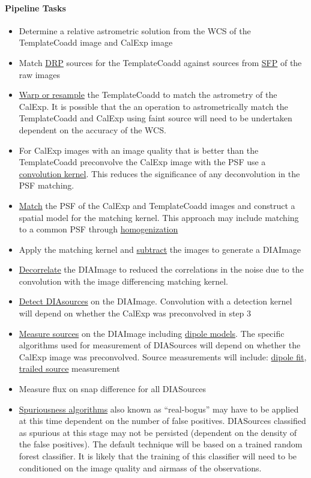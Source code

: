 \paragraph{Pipeline Tasks}
\begin{itemize}
\item Determine a relative astrometric solution from the WCS of the TemplateCoadd image and CalExp image
\item Match \hyperref[sec:apSourcemeasurement]{DRP} sources for the TemplateCoadd against sources from \hyperref[sec:apSingleFrameProcessing]{SFP} of the raw images 
\item \hyperref[sec:acWarping]{Warp or resample} the TemplateCoadd to match the astrometry of the CalExp. It is possible that the an operation to astrometrically match the TemplateCoadd and CalExp using faint source will need to be undertaken dependent on the accuracy of the WCS.
\item For CalExp images with an image quality that is better than the TemplateCoadd preconvolve the CalExp image with the PSF use a  \hyperref[sec:spKernels]{convolution kernel}. This reduces the significance of any deconvolution in the PSF matching.
\item \hyperref[sec:acDiffImDecorrelation]{Match} the PSF of the CalExp and TemplateCoadd images and construct a spatial model for the matching kernel. This approach may include matching to a common PSF through \hyperref[sec:acPSFHomogenization]{homogenization} 
\item Apply the matching kernel and \hyperref[sec:acImageSubtraction]{subtract} the images to generate a DIAImage
\item \hyperref[sec:acDiffImDecorrelation]{Decorrelate} the DIAImage to reduced the correlations in the noise due to the convolution with the image differencing matching kernel. 
\item \hyperref[sec:acSourceDetection]{Detect DIAsources} on the DIAImage. Convolution with a detection kernel will depend on whether the CalExp was preconvolved in step 3
\item \hyperref[sec:acDiffImMeasurement]{ Measure sources} on the DIAImage including \hyperref[sec:acDipoleModels]{dipole models}. The specific algorithms used for measurement of DIASources will depend on whether the CalExp image was preconvolved.  Source measurements will include: \hyperref[sec:acDipoleModels]{dipole fit}, \hyperref[sec:acTrailedPointSourceModels]{trailed source} measurement
\item Measure flux on snap difference for all DIASources
\item \hyperref[sec:acSpuriousnessAlgorithms]{Spuriousness algorithms} also known as ``real-bogus'' may have to be applied at this time dependent on the number of false positives. DIASources classified as spurious at this stage may not be persisted (dependent on the density of the false positives). The default technique will be based on a trained random forest classifier. It is likely that the training of this classifier will need to be conditioned on the image quality and airmass of the observations.
\end{itemize}

